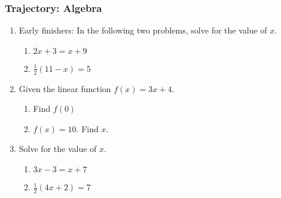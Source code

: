 

\fancyhead[LE]{\thepage}



\subsubsection*{Trajectory: Algebra}
\begin{enumerate}
\item Early finishers: In the following two problems, solve for the value of $x$.
  \begin{multicols}{2}
    \begin{enumerate}
      \item   $2x+3=x + 9$ \vspace{6cm}
      \item   $\frac{1}{2}(11-x)=5$ \vspace{3cm}
    \end{enumerate}
  \end{multicols}
  \vspace{3cm}

\item Given the linear function $f(x)=3x+4$.
\begin{multicols}{2}
  \begin{enumerate}
    \item Find $f(0)$ \vspace{6cm}
    \item   $f(x)=10$. Find $x$. \vspace{3cm}
  \end{enumerate}
\end{multicols}
  \vspace{3cm}

\item Solve for the value of $x$.
  \begin{multicols}{2}
    \begin{enumerate}
      \item   $3x-3=x + 7$ \vspace{6cm}
      \item   $\frac{1}{2}(4x+2)=7$ \vspace{6cm}
    \end{enumerate}
  \end{multicols}
  \vspace{5cm}


\end{enumerate}
